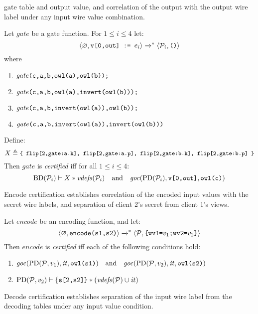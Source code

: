 gate table and output value, and correlation of the output with
the output wire label under any input wire value combination.
\begin{definition}
  \label{definition-gate-certification}
Let $\mathit{gate}$ be a gate function. For $1 \le i \le 4$  let:
  $$
  \langle \varnothing,\texttt{v[0,out] := } e_i \rangle\xrightarrow{}^{*}\langle \mathcal{P}_i,\texttt{()} \rangle
  $$
  where
  \begin{enumerate}
    \item $\mathit{gate}\texttt{(c,a,b,owl(a),owl(b));}$
    \item $\mathit{gate}\texttt{(c,a,b,owl(a),invert(owl(b)));}$
    \item $\mathit{gate}\texttt{(c,a,b,invert(owl(a)),owl(b));}$
    \item $\mathit{gate}\texttt{(c,a,b,invert(owl(a)),invert(owl(b)))}$
  \end{enumerate}
  Define:
  $${\small X \triangleq \texttt{\{ flip[2,gate:a.k], flip[2,gate:a.p], flip[2,gate:b.k], flip[2,gate:b.p] \}}}$$
  Then $\mathit{gate}$ is \emph{certified} iff for all $1 \le i \le 4$:
  $$
  \mathrm{BD}(\mathcal{P}_i) \vdash X * \mathit{vdefs}(\mathcal{P}_i) 
  \quad \text{and} \quad \mathit{goc}(\mathrm{PD}(\mathcal{P}_i),\texttt{v[0,out]},\texttt{owl(c)})
  $$
\end{definition}
Encode certification establishes correlation of the encoded input values with
the secret wire labels, and separation of client 2's secret from client 1's views. 
\begin{definition}
  Let $\mathit{encode}$ be an encoding function, and let:
  $$
  \langle \varnothing,\texttt{encode(s1,s2)} \rangle \xrightarrow{}^{*}
  \langle \mathcal{P},\texttt{\{wv1=}v_1\texttt{;wv2=}v_2\texttt{\}} \rangle
  $$
  Then $\mathit{encode}$ is \emph{certified} iff each of the following conditions hold:
  \begin{enumerate}[\hspace{5mm}i.]
  \item $\mathit{goc}(\mathrm{PD}(\mathcal{P},v_1),\mathit{it},\texttt{owl(s1)}) \quad \text{and} \quad
    \mathit{goc}(\mathrm{PD}(\mathcal{P},v_2),\mathit{it},\texttt{owl(s2)})$
  \item $\mathrm{PD}(\mathcal{P},v_2) \vdash \{\texttt{s[2,s2]\}} * (\mathit{vdefs}(\mathcal{P}) \cup \mathit{it})$
  \end{enumerate}
\end{definition}
Decode certification establishes separation of the input wire
label from the decoding tables under any input value condition. 

